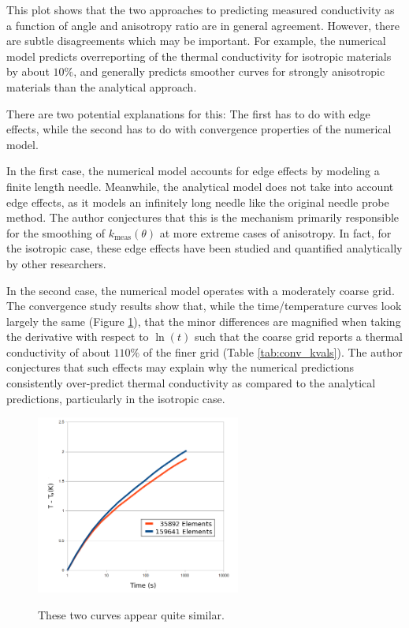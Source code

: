 This plot shows that the two approaches to predicting measured conductivity
as a function of angle and anisotropy ratio are in general agreement. However,
there are subtle disagreements which may be important. For example, the
numerical model predicts overreporting of the thermal conductivity for
isotropic materials by about \(10\%\), and generally predicts smoother
curves for strongly anisotropic materials than the analytical approach.

There are two potential explanations for this: The first has to do with edge
effects, while the second has to do with convergence properties of the numerical
model.

In the first case, the numerical model accounts for edge effects by
modeling a finite length needle. Meanwhile, the analytical model does not take
into account edge effects, as it models an infinitely long needle like the
original needle probe method. The author conjectures that this is the mechanism
primarily responsible for the smoothing of \(k_{\textrm{meas}}(\theta)\) at more extreme
cases of anisotropy. In fact, for the isotropic case, these edge effects have
been studied and quantified analytically by other researchers.


In the second case, the numerical model operates with a moderately coarse grid.
The convergence study results show that, while the time/temperature curves look
largely the same (Figure \ref{fig:conv_curves}), that the minor differences are magnified when taking the
derivative with respect to \(\ln(t)\) such that the coarse grid reports a
thermal conductivity of about \(110\%\) of the finer grid (Table \ref{tab:conv_kvals}). The author
conjectures that such effects may explain why the numerical predictions
consistently over-predict thermal conductivity as compared to the analytical
predictions, particularly in the isotropic case.


\begin{figure}[h]
\centering
\includegraphics[width=0.6\textwidth]{fig/conv_curves.png}
\label{fig:conv_curves}
\caption{These two curves appear quite similar.}
\end{figure}


